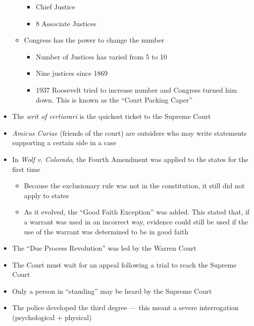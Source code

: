 \documentclass[12pt]{article}
\begin{document}
\begin{itemize}
\begin{itemize}
\begin{itemize}
          \item Chief Justice

          \item 8 Associate Justices

        \end{itemize}

      \item Congress has the power to change the number

        \begin{itemize}

          \item Number of Justices has varied from 5 to 10

          \item Nine justices since 1869

          \item 1937 Roosevelt tried to increase number and Congress turned him down. This is known as the “Court Packing Caper”

        \end{itemize}

    \end{itemize}

  \item The \textit{writ of certiorari} is the quickest ticket to the Supreme Court

  \item \textit{Amicus Curiae} (friends of the court) are outsiders who may write statements supporting a certain side in a case

  \item In \textit{Wolf v. Colorado}, the Fourth Amendment was applied to the states for the first time

    \begin{itemize}

      \item Because the exclusionary rule was not in the constitution, it still did not apply to states

      \item As it evolved, the “Good Faith Exception” was added. This stated that, if a warrant was used in an incorrect way, evidence could still be used if the use of the warrant was determined to be in good faith

    \end{itemize}

  \item The “Due Process Revolution” was led by the Warren Court

  \item The Court must wait for an appeal following a trial to reach the Supreme Court

  \item Only a person in “standing” may be heard by the Supreme Court

  \item The police developed the third degree — this meant a severe interrogation (psychological + physical)

\end{itemize}
\end{document}
